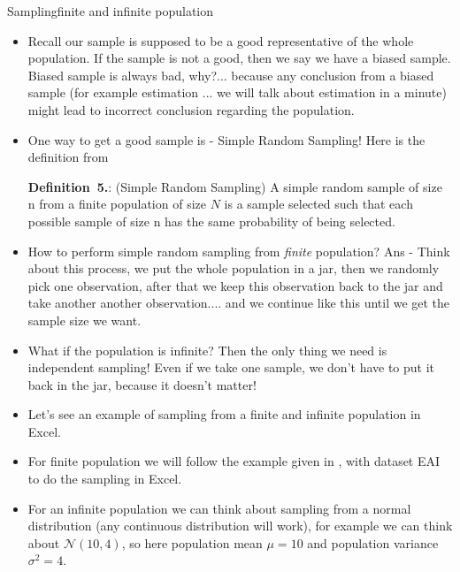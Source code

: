 \documentclass[8pt, usepdftitle=false]{beamer}
\newcounter{mytheorem}
\renewcommand{\themytheorem}{5.\arabic{mytheorem}}
\newcommand{\Thm}[1]{\refstepcounter{mytheorem}\textbf{#1\color{blue}\themytheorem}:}
\begin{document}
\begin{frame}[allowframebreaks]{Sampling}{finite and infinite population}
\begin{itemize}
\framebreak


  \item Recall our sample is supposed to be a good representative of the whole population. If the sample is not a good, then we say we have a \alert{biased sample}. Biased sample is always bad, why?... because any conclusion from a biased sample  (for example estimation ... we will talk about estimation in a minute)  might lead to incorrect conclusion regarding the population.

  \item One way to get a good sample is - \alert{Simple Random Sampling!} Here is the definition from \citet*{anderson_statistics_2020}

  \begin{varblock}{\Thm{Definition~} (Simple Random Sampling) }
     A simple random sample of size n from a finite population of size $N$ is a sample selected such that each possible sample of size n has the same probability of being selected.
  \end{varblock}

  \framebreak

  \item How to perform simple random sampling from \emph{finite} population? Ans - Think about this process, we put the whole population in a jar, then we randomly pick one observation, after that we keep this observation back to the jar and take another another observation.... and we continue like this until we get the sample size we want. 

  \item What if the population is infinite? Then the only thing we need is independent sampling! Even if we take one sample, we don't have to put it back in the jar, because it doesn't matter!
  
  \framebreak

  \item Let's see an example of sampling from a finite and infinite population in Excel. 

  \item For finite population we will follow the example given in \cite{anderson_statistics_2020}, with dataset EAI to do the sampling in Excel.

  \item For an infinite population we can think about sampling from a normal distribution (any continuous distribution will work), for example we can think about $\mathcal{N}(10, 4)$, so here population mean $\mu = 10$ and population variance $\sigma^2 = 4$.


\end{itemize}
\end{frame}
\end{document}
